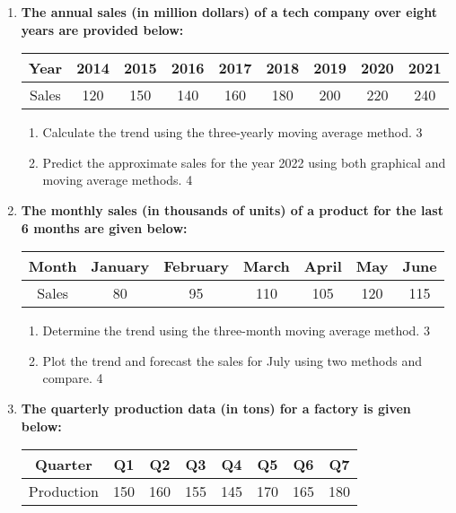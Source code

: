 \documentclass[a4paper,oneside]{book}
\begin{document}
\begin{enumerate}
\item
\textbf{The annual sales (in million dollars) of a tech company over eight years are provided below:}

\begin{table}[h]
\centering
\begin{tabular}{ccccccccc}
Year     & 2014 & 2015 & 2016 & 2017 & 2018 & 2019 & 2020 & 2021 \\ \hline
Sales    & 120  & 150  & 140  & 160  & 180  & 200  & 220  & 240   
\end{tabular}
\end{table}

\begin{enumerate}
    \item  
    Calculate the trend using the three-yearly moving average method. \hfill 3
    \item
    Predict the approximate sales for the year 2022 using both graphical and moving average methods. \hfill 4
\end{enumerate}
  
  \item
\textbf{The monthly sales (in thousands of units) of a product for the last 6 months are given below:}

\begin{table}[h]
\centering
\begin{tabular}{ccccccc}
Month     & January & February & March & April & May & June \\ \hline
Sales     & 80      & 95       & 110   & 105   & 120  & 115  \\
\end{tabular}
\end{table}

\begin{enumerate}
\item
Determine the trend using the three-month moving average method. \hfill 3
\item
Plot the trend and forecast the sales for July using two methods 
and compare. \hfill 4
\end{enumerate}

\item
\textbf{The quarterly production data (in tons) for a factory is given below:}

\begin{table}[h]
\centering
\begin{tabular}{cccccccc}
Quarter    & Q1     & Q2     & Q3     & Q4     & Q5     & Q6     & Q7     \\ \hline
Production & 150    & 160    & 155    & 145    & 170    & 165    & 180    \\
\end{tabular}
\end{table}


\end{enumerate}
\end{document}
